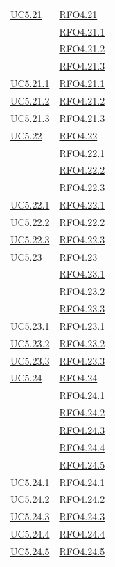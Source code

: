 \begin{longtable}{|>{\centering}m{5cm}|m{5cm}<{\centering}|}
\hyperref[UC5.21]{UC5.21} & \hyperlink{RFO4.21}{RFO4.21}\\
& \hyperlink{RFO4.21.1}{RFO4.21.1}\\
& \hyperlink{RFO4.21.2}{RFO4.21.2}\\
& \hyperlink{RFO4.21.3}{RFO4.21.3}\\ \hline
\hyperref[UC5.21.1]{UC5.21.1} & \hyperlink{RFO4.21.1}{RFO4.21.1}\\\hline
\hyperref[UC5.21.2]{UC5.21.2} & \hyperlink{RFO4.21.2}{RFO4.21.2}\\\hline
\hyperref[UC5.21.3]{UC5.21.3} & \hyperlink{RFO4.21.3}{RFO4.21.3}\\\hline

\hyperref[UC5.22]{UC5.22} & \hyperlink{RFO4.22}{RFO4.22}\\
& \hyperlink{RFO4.22.1}{RFO4.22.1}\\
& \hyperlink{RFO4.22.2}{RFO4.22.2}\\
& \hyperlink{RFO4.22.3}{RFO4.22.3}\\ \hline
\hyperref[UC5.22.1]{UC5.22.1} & \hyperlink{RFO4.22.1}{RFO4.22.1}\\\hline
\hyperref[UC5.22.2]{UC5.22.2} & \hyperlink{RFO4.22.2}{RFO4.22.2}\\\hline
\hyperref[UC5.22.3]{UC5.22.3} & \hyperlink{RFO4.22.3}{RFO4.22.3}\\\hline

\hyperref[UC5.23]{UC5.23} & \hyperlink{RFO4.23}{RFO4.23}\\
& \hyperlink{RFO4.23.1}{RFO4.23.1}\\
& \hyperlink{RFO4.23.2}{RFO4.23.2}\\
& \hyperlink{RFO4.23.3}{RFO4.23.3}\\ \hline
\hyperref[UC5.23.1]{UC5.23.1} & \hyperlink{RFO4.23.1}{RFO4.23.1}\\\hline
\hyperref[UC5.23.2]{UC5.23.2} & \hyperlink{RFO4.23.2}{RFO4.23.2}\\\hline
\hyperref[UC5.23.3]{UC5.23.3} & \hyperlink{RFO4.23.3}{RFO4.23.3}\\\hline

\hyperref[UC5.24]{UC5.24} & \hyperlink{RFO4.24}{RFO4.24}\\
& \hyperlink{RFO4.24.1}{RFO4.24.1}\\
& \hyperlink{RFO4.24.2}{RFO4.24.2}\\
& \hyperlink{RFO4.24.3}{RFO4.24.3}\\
& \hyperlink{RFO4.24.4}{RFO4.24.4}\\
& \hyperlink{RFO4.24.5}{RFO4.24.5}\\ \hline
\hyperref[UC5.24.1]{UC5.24.1} & \hyperlink{RFO4.24.1}{RFO4.24.1}\\ \hline
 \hyperref[UC5.24.2]{UC5.24.2} & \hyperlink{RFO4.24.2}{RFO4.24.2}\\ \hline
\hyperref[UC5.24.3]{UC5.24.3} & \hyperlink{RFO4.24.3}{RFO4.24.3}\\ \hline
\hyperref[UC5.24.4]{UC5.24.4} & \hyperlink{RFO4.24.4}{RFO4.24.4}\\ \hyperref[UC5.24.5]{UC5.24.5} & \hyperlink{RFO4.24.5}{RFO4.24.5}\\ \hline


\end{longtable}
